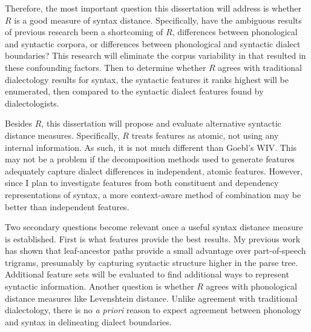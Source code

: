 \documentclass[11pt,letterpaper]{article}
\begin{document}

Therefore, the most important question this dissertation will address
is whether $R$ is a good measure of syntax distance. Specifically,
have the ambiguous results of previous research been a shortcoming of
$R$, differences between phonological and syntactic corpora, or
differences between phonological and syntactic dialect boundaries?
This research will eliminate the corpus variability in
 that resulted in these confounding factors. Then
to determine whether $R$ agrees with traditional dialectology results
for syntax, the syntactic features it ranks highest will be
enumerated, then compared to the syntactic dialect features found by
dialectologists.

Besides $R$, this dissertation will propose and evaluate alternative
syntactic distance measures. Specifically, $R$ treats features
as atomic, not using any internal information. As such, it is not much
different than Goebl's WIV. This may not be a problem if the
decomposition methods used to generate features adequately capture
dialect differences in independent, atomic features. However, since I
plan to investigate features from both constituent and dependency
representations of syntax, a more context-aware method of combination
may be better than independent features.

Two secondary questions become relevant once a useful syntax distance
measure is established. First is what features provide the best
results. My previous work has shown that leaf-ancestor paths provide a
small advantage over part-of-speech trigrams, presumably by capturing
syntactic structure higher in the parse tree. Additional feature sets
will be evaluated to find additional ways to represent syntactic
information. Another question is whether $R$ agrees with phonological
distance measures like Levenshtein distance.  Unlike agreement with
traditional dialectology, there is no {\it a priori} reason to expect
agreement between phonology and syntax in delineating dialect
boundaries.




\end{document}

